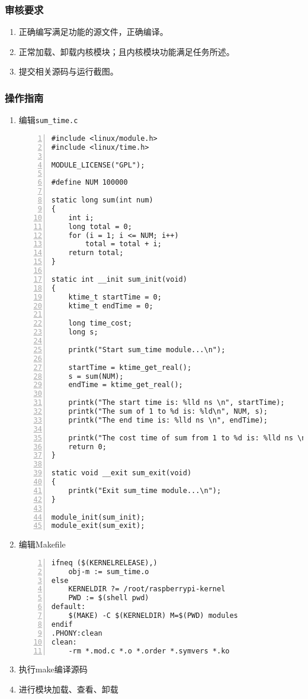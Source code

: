 \documentclass{article}
\begin{document}
\subsubsection{审核要求}
\begin{enumerate}
    \item 正确编写满足功能的源文件，正确编译。
    \item 正常加载、卸载内核模块；且内核模块功能满足任务所述。
    \item 提交相关源码与运行截图。
\end{enumerate}

\subsubsection{操作指南}
\begin{enumerate}
	\item 编辑\verb|sum_time.c|
\begin{lstlisting}[numbers=left]
#include <linux/module.h>
#include <linux/time.h>

MODULE_LICENSE("GPL");

#define NUM 100000

static long sum(int num)
{
	int i;
	long total = 0;
	for (i = 1; i <= NUM; i++)
		total = total + i;	
	return total;
}

static int __init sum_init(void)
{
	ktime_t startTime = 0;
    ktime_t endTime = 0;
    
	long time_cost;
	long s;

	printk("Start sum_time module...\n");
    
	startTime = ktime_get_real(); 
    s = sum(NUM);
    endTime = ktime_get_real(); 

	printk("The start time is: %lld ns \n", startTime);
    printk("The sum of 1 to %d is: %ld\n", NUM, s);
	printk("The end time is: %lld ns \n", endTime);
	
	printk("The cost time of sum from 1 to %d is: %lld ns \n", NUM, endTime - startTime);
	return 0;
}

static void __exit sum_exit(void)
{
	printk("Exit sum_time module...\n");
}

module_init(sum_init);
module_exit(sum_exit);

\end{lstlisting}
    \item 编辑Makefile
\begin{lstlisting}[numbers=left]
ifneq ($(KERNELRELEASE),)
	obj-m := sum_time.o
else
	KERNELDIR ?= /root/raspberrypi-kernel
	PWD := $(shell pwd)
default:
	$(MAKE) -C $(KERNELDIR) M=$(PWD) modules
endif
.PHONY:clean
clean:
	-rm *.mod.c *.o *.order *.symvers *.ko

\end{lstlisting}
    \item 执行make编译源码
    \item 进行模块加载、查看、卸载
\end{enumerate}
\end{document}
